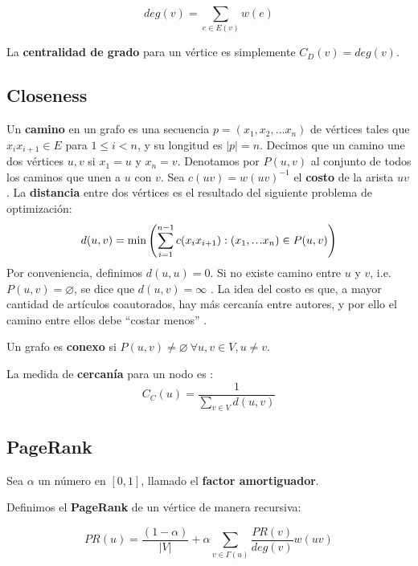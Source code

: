 \documentclass[journal]{IEEEtran}
\newcommand\mydots{\hbox to 1em{.\hss.\hss.}}
\begin{document}
\begin{equation}
	deg(v) = \sum_{e \in E(v)} w(e)
\end{equation}

La \textbf{centralidad de grado} para un vértice es simplemente \(C_D (v) = deg(v)\).

\subsection{Closeness}

Un \textbf{camino} en un grafo es una secuencia \(p = (x_1, x_2, \dots x_n)\) de vértices tales que \(x_{i}x_{i+1} \in E\) para \(1 \leq i < n\), y su longitud es \(|p| = n\). Decimos que un camino une dos vértices \(u, v\) si \(x_1 = u\) y \(x_n = v\). Denotamos por \(P(u, v)\) al conjunto de todos los caminos que unen a \(u\) con \(v\). Sea \(c(uv) = w(uv)^{-1}\) el \textbf{costo} de la arista \(uv\). La \textbf{distancia} entre dos vértices es el resultado del siguiente problema de optimización:
\begin{equation}
d(u, v) = \min \left(\sum_{i=1}^{n-1} c(x_{i}x_{i+1}) : (x_1, \mydots x_n) \in P(u, v)\right)
\end{equation}
Por conveniencia, definimos \(d(u, u) = 0\). Si no existe camino entre \(u\) y \(v\), i.e. \(P(u, v) = \varnothing\), se dice que \(d(u, v) = \infty\) \cite{bollobas}. La idea del costo es que, a mayor cantidad de artículos coautorados, hay más cercanía entre autores, y por ello el camino entre ellos debe ``costar menos'' \cite{newman}.

Un grafo es \textbf{conexo} si \(P(u, v) \neq \varnothing~\forall u, v \in V, u \neq v\).

La medida de \textbf{cercanía} para un nodo es \cite{brandes}:
\begin{equation}
C_C (u) = \frac{1}{\sum_{v \in V} d(u, v)}
\end{equation}

\subsection{PageRank}

Sea \(\alpha\) un número en \([0, 1]\), llamado el \textbf{factor amortiguador}.

Definimos el \textbf{PageRank} de un vértice de manera recursiva:

\begin{equation}
	PR(u) = \frac{(1-\alpha)}{|V|} + \alpha \sum_{v \in \Gamma(u)} \frac{PR(v)}{deg(v)} w(uv)
\end{equation}
\end{document}
